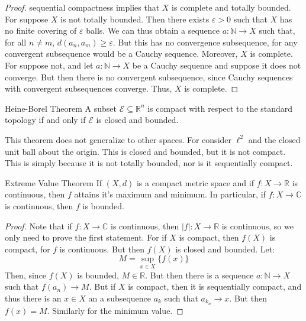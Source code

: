 \documentclass[crop=false,class=article,oneside]{standalone}
\begin{document}
\begin{proof}
                sequential compactness implies that $X$ is
                complete and totally bounded. For suppose $X$ is
                not totally bounded. Then there exists
                $\varepsilon>0$ such that $X$ has no finite
                covering of $\varepsilon$ balls. We can thus
                obtain a sequence $a:\mathbb{N}\rightarrow{X}$
                such that, for all $n\ne{m}$,
                $d(a_{n},a_{m})\geq\varepsilon$. But this
                has no convergence subsequence, for any convergent
                subsequence would be a Cauchy sequence. Moreover,
                $X$ is complete. For suppose not, and let
                $a:\mathbb{N}\rightarrow{X}$ be a Cauchy sequence
                and suppose it does not converge. But then there
                is no convergent subsequence, since Cauchy
                sequences with convergent subsequences converge.
                Thus, $X$ is complete.
            \end{proof}
            \begin{ltheorem}{Heine-Borel Theorem}
                A subset $\mathcal{E}\subseteq\mathbb{R}^{n}$ is
                compact with respect to the standard topology if and
                only if $\mathcal{E}$ is closed and bounded.
            \end{ltheorem}
            This theorem does not generalize to other spaces. For
            consider $\ell^{2}$ and the closed unit ball about the
            origin. This is closed and bounded, but it is not
            compact. This is simply because it is not totally
            bounded, nor is it sequentially compact.
            \begin{ltheorem}{Extreme Value Theorem}
                If $(X,d)$ is a compact metric space and if
                $f:X\rightarrow\mathbb{R}$ is continuous, then
                $f$ attains it's maximum and minimum. In particular,
                if $f:X\rightarrow\mathbb{C}$ is continuous, then
                $f$ is bounded.
            \end{ltheorem}
            \begin{proof}
                Note that if $f:X\rightarrow\mathbb{C}$ is
                continuous, then $|f|:X\rightarrow\mathbb{R}$ is
                continuous, so we only need to prove the first
                statement. For if $X$ is compact, then $f(X)$ is
                compact, for $f$ is continuous. But then $f(X)$
                is closed and bounded. Let:
                \begin{equation}
                    M=\underset{x\in{X}}\sup\{f(x)\}
                \end{equation}
                Then, since $f(X)$ is bounded, $M\in\mathbb{R}$.
                But then there is a sequence
                $a:\mathbb{N}\rightarrow{X}$ such that
                $f(a_{n})\rightarrow{M}$. But if $X$ is
                compact, then it is sequentially compact, and
                thus there is an $x\in{X}$ an a subsequence
                $a_{k}$ such that $a_{k_{n}}\rightarrow{x}$.
                But then $f(x)=M$. Similarly for the minimum value.
            \end{proof}
\end{document}
